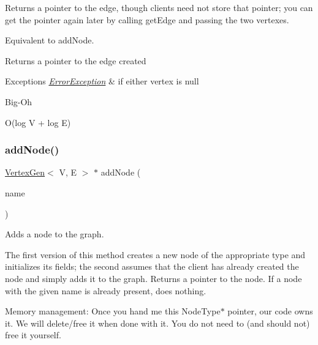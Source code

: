 Returns a pointer to the edge, though clients need not store that pointer; you can get the pointer again later by calling get\+Edge and passing the two vertexes.

Equivalent to add\+Node.

\begin{DoxyReturn}{Returns}
a pointer to the edge created 
\end{DoxyReturn}

\begin{DoxyExceptions}{Exceptions}
{\em \mbox{\hyperlink{classErrorException}{Error\+Exception}}} & if either vertex is null \\
\hline
\end{DoxyExceptions}
\begin{DoxyRefDesc}{Big-\/\+Oh}
\item[\mbox{\hyperlink{BigOh__BigOh000005}{Big-\/\+Oh}}]O(log V + log E) \end{DoxyRefDesc}
\mbox{\label{classGraph_acd763aa09491315536b5d2734cd82b89}} 
\subsubsection{\texorpdfstring{add\+Node()}{addNode()}\hspace{0.1cm}{\footnotesize\ttfamily [1/2]}}
{\footnotesize\ttfamily \mbox{\hyperlink{classVertexGen}{Vertex\+Gen}}$<$ V, E $>$  $\ast$ add\+Node (\begin{DoxyParamCaption}\item[{const std\+::string \&}]{name }\end{DoxyParamCaption})\hspace{0.3cm}{\ttfamily [inherited]}}



Adds a node to the graph. 

The first version of this method creates a new node of the appropriate type and initializes its fields; the second assumes that the client has already created the node and simply adds it to the graph. Returns a pointer to the node. If a node with the given name is already present, does nothing.

Memory management\+: Once you hand me this Node\+Type$\ast$ pointer, our code owns it. We will delete/free it when done with it. You do not need to (and should not) free it yourself.


